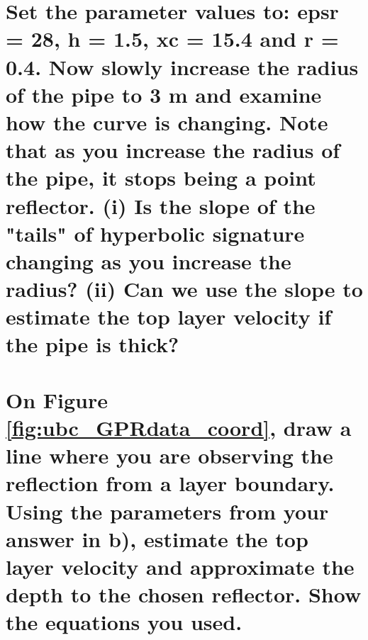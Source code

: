 \documentclass[twosides]{EOSC350Lab} %
\begin{document}
\part{Set the parameter values to: epsr = 28, h = 1.5, xc = 15.4 and r = 0.4. Now slowly increase the radius of the pipe to 3 m and examine how the curve is changing. Note that as you increase the radius of the pipe, it stops being a point reflector. (i) Is the slope of the "tails" of hyperbolic signature changing as you increase the radius? (ii) Can we use the slope to estimate the top layer velocity if the pipe is thick?}





	\vspace{60pt}







		\part{On Figure \ref{fig:ubc_GPRdata_coord}, draw a line where you are observing the reflection from a layer boundary. Using the parameters from your answer in {\bf b)}, estimate the top layer velocity and approximate the depth to the chosen reflector. Show the equations you used.}
		



			\vspace*{40pt}


			





		

		

%
\end{document}
